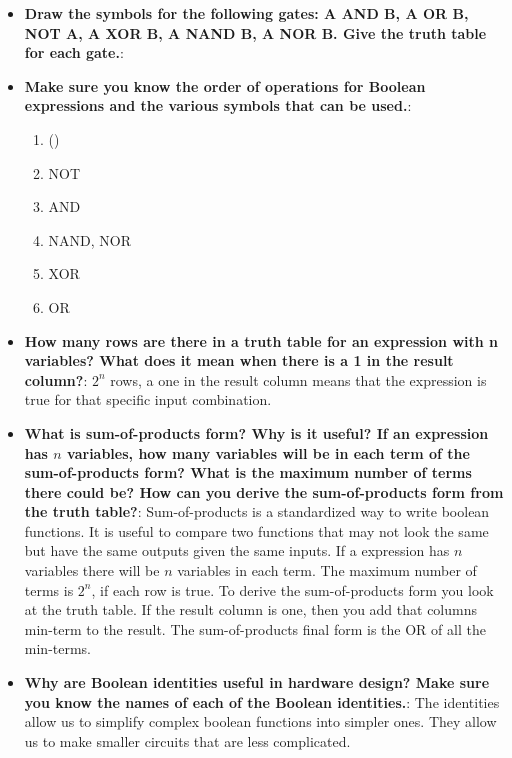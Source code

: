 \documentclass{report}
\begin{document}
    \pagebreak 
    \begin{itemize}
        \item \textbf{Draw the symbols for the following gates: A AND B, A OR B, NOT A, A XOR B, A NAND B, A NOR B. Give the truth table for each gate.}:
        \item \textbf{Make sure you know the order of operations for Boolean expressions and the various symbols that can be used.}:
            \begin{enumerate}
                \item ()
                \item NOT
                \item AND
                \item NAND, NOR
                \item XOR
                \item OR
            \end{enumerate}
        \item \textbf{How many rows are there in a truth table for an expression with n variables? What does it mean when there is a 1 in the result column?}: $2^{n}$ rows, a one in the result column means that the expression is true for that specific input combination. 
        \item \textbf{What is sum-of-products form? Why is it useful? If an expression has $n$ variables, how many variables will be in each term of the sum-of-products form? What is the maximum number of terms there could be? How can you derive the sum-of-products form from the truth table?}:
            Sum-of-products is a standardized way to write boolean functions. It is useful to compare two functions that may not look the same but have the same outputs given the same inputs.
            \bigbreak \noindent 
            If a expression has $n$ variables there will be $n$ variables in each term. The maximum number of terms is $2^{n}$, if each row is true.
            \bigbreak \noindent 
            To derive the sum-of-products form you look at the truth table. If the result column is one, then you add that columns min-term to the result. The sum-of-products final form is the OR of all the min-terms.
        \item \textbf{Why are Boolean identities useful in hardware design? Make sure you know the names of each of the Boolean identities.}:
            The identities allow us to simplify complex boolean functions into simpler ones. They allow us to make smaller circuits that are less complicated.

\end{itemize}
\end{document}
